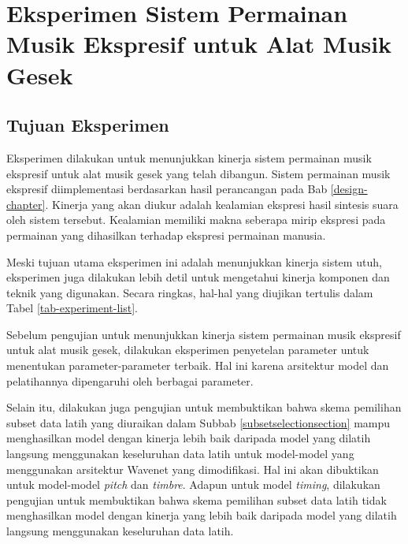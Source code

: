 \chapter{Eksperimen Sistem Permainan Musik Ekspresif untuk Alat Musik Gesek}

\section{Tujuan Eksperimen}

Eksperimen dilakukan untuk menunjukkan kinerja sistem permainan musik ekspresif untuk alat musik gesek yang telah dibangun. Sistem permainan musik ekspresif diimplementasi berdasarkan hasil perancangan pada Bab \ref{design-chapter}. Kinerja yang akan diukur adalah kealamian ekspresi hasil sintesis suara oleh sistem tersebut. Kealamian memiliki makna seberapa mirip ekspresi pada permainan yang dihasilkan terhadap ekspresi permainan manusia.

Meski tujuan utama eksperimen ini adalah menunjukkan kinerja sistem utuh, eksperimen juga dilakukan lebih detil untuk mengetahui kinerja komponen dan teknik yang digunakan. Secara ringkas, hal-hal yang diujikan tertulis dalam Tabel \ref{tab-experiment-list}.

Sebelum pengujian untuk menunjukkan kinerja sistem permainan musik ekspresif untuk alat musik gesek, dilakukan eksperimen penyetelan parameter untuk menentukan parameter-parameter terbaik. Hal ini karena arsitektur model dan pelatihannya dipengaruhi oleh berbagai parameter.

Selain itu, dilakukan juga pengujian untuk membuktikan bahwa skema pemilihan subset data latih yang diuraikan dalam Subbab \ref{subsetselectionsection} mampu menghasilkan model dengan kinerja lebih baik daripada model yang dilatih langsung menggunakan keseluruhan data latih untuk model-model yang menggunakan arsitektur Wavenet yang dimodifikasi. Hal ini akan dibuktikan untuk model-model \textit{pitch} dan \textit{timbre}. Adapun untuk model \textit{timing}, dilakukan pengujian untuk membuktikan bahwa skema pemilihan subset data latih tidak menghasilkan model dengan kinerja yang lebih baik daripada model yang dilatih langsung menggunakan keseluruhan data latih.

